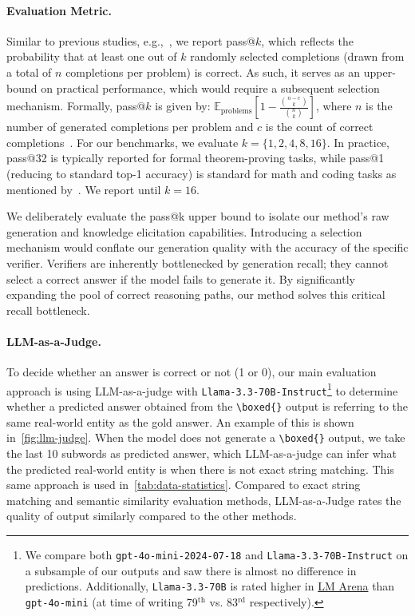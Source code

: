 \documentclass[11pt]{article}
\begin{document}
\paragraph{Evaluation Metric.}
Similar to previous studies, e.g.,~\citet{ma2025reasoningmodelseffectivethinking}, we report pass@$k$, which reflects the probability that at least one out of $k$ randomly selected completions (drawn from a total of $n$ completions per problem) is correct. As such, it serves as an upper-bound on practical performance, which would require a subsequent selection mechanism. Formally, pass@$k$ is given by: $\mathbb{E}_{\text{problems}}\left[1 - \frac{\binom{n-c}{k}}{\binom{n}{k}}\right]$, where $n$ is the number of generated completions per problem and $c$ is the count of correct completions~\citep{chen2021evaluating}. For our benchmarks, we evaluate $k = \{1, 2, 4, 8, 16\}$. In practice, pass@32 is typically reported for formal theorem-proving tasks, while pass@1 (reducing to standard top-1 accuracy) is standard for math and coding tasks as mentioned by~\citet{ma2025reasoningmodelseffectivethinking}. We report until $k=16$. 

We deliberately evaluate the pass@k upper bound to isolate our method's raw generation and knowledge elicitation capabilities. Introducing a selection mechanism would conflate our generation quality with the accuracy of the specific verifier. Verifiers are inherently bottlenecked by generation recall; they cannot select a correct answer if the model fails to generate it. By significantly expanding the pool of correct reasoning paths, our method solves this critical recall bottleneck.


\paragraph{LLM-as-a-Judge.} To decide whether an answer is correct or not (1 or 0), our main evaluation approach is using LLM-as-a-judge with \texttt{Llama-3.3-70B-Instruct}\footnote{We compare both \texttt{gpt-4o-mini-2024-07-18} and \texttt{Llama-3.3-70B-Instruct} on a subsample of our outputs and saw there is almost no difference in predictions. Additionally, \texttt{Llama-3.3-70B} is rated higher in \href{https://lmarena.ai}{LM Arena} than \texttt{gpt-4o-mini} (at time of writing 79$^\text{th}$ vs. 83$^\text{rd}$ respectively).} to determine whether a predicted answer obtained from the \verb|\boxed{}| output is referring to the same real-world entity as the gold answer. 
An example of this is shown in~\cref{fig:llm-judge}.
When the model does not generate a \verb|\boxed{}| output, we take the last 10 subwords as predicted answer, which LLM-as-a-judge can infer what the predicted real-world entity is when there is not exact string matching.
This same approach is used in~\cref{tab:data-statistics}. Compared to exact string matching and semantic similarity evaluation methods, LLM-as-a-Judge rates the quality of output similarly compared to the other methods.
\end{document}
